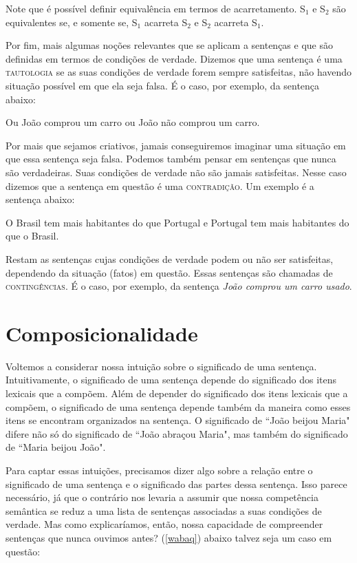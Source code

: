 \n Note que é possível definir equivalência em termos de acarretamento. S$_{1}$ e S$_{2}$ são equivalentes se, e somente se, S$_{1}$ acarreta S$_{2}$ e S$_{2}$ acarreta S$_{1}$.

Por fim, mais algumas no\-çõ\-es relevantes que se aplicam a sen\-ten\-ças e que são definidas em termos de condi\-çõ\-es de verdade. Dizemos que uma sentença é uma \textsc{tautologia} se as suas condi\-çõ\-es de verdade forem sempre satisfeitas, não havendo situa\-ção possível em que ela seja falsa. É o caso, por exemplo, da sentença abaixo:

\begin{exe}
    \ex Ou João comprou um carro ou João não comprou
um carro. \label{tau}
\end{exe}

\n Por mais que sejamos criativos, jamais conseguiremos imaginar uma situa\-ção em que essa sentença seja falsa. Podemos também pensar em sen\-ten\-ças que nunca são verdadeiras. Suas condi\-çõ\-es de verdade não são jamais satisfeitas. Nesse caso dizemos que a sentença em questão é uma \textsc{contradi\-ção}. Um exemplo é a sentença abaixo:

\begin{exe}
    \ex O Brasil tem mais habitantes do que Portugal e Portugal tem mais habitantes do que o Brasil. \label{con}
\end{exe}

 \n Restam as sen\-ten\-ças cujas condi\-çõ\-es de verdade podem ou não ser satisfeitas,
dependendo da situa\-ção (fatos) em questão. Essas sen\-ten\-ças
são chamadas de \textsc{contingências}. É o caso, por exemplo, da
sentença \textit{João comprou um carro usado}.

\section{Composicionalidade}

Voltemos a considerar nossa intui\-ção sobre o significado de uma
sentença. Intuitivamente, o significado de uma sentença depende do
significado dos itens lexicais que a compõem. Além de depender do
significado dos itens lexicais que a compõem, o significado de uma
sentença depende também da maneira como esses itens se encontram
organizados na sentença. O significado de ``João beijou Maria"
difere não só do significado de ``João abraçou Maria", mas também
do significado de ``Maria beijou João".

Para captar essas intui\-çõ\-es, precisamos dizer algo sobre a
rela\-ção entre o significado de uma sentença e o significado das
partes dessa sentença. Isso parece necessário, já que o contrário
nos levaria a assumir que nossa competência semântica se reduz a
uma lista de sen\-ten\-ças associadas a suas condi\-çõ\-es de
verdade. Mas como explicaríamos, então, nossa capacidade de
compreender sen\-ten\-ças que nunca ouvimos antes? (\ref{wabaq})
abaixo talvez seja um caso em questão:


